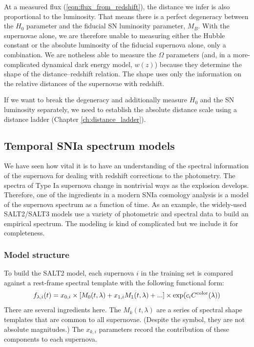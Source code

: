 At a measured flux (\ref{eqn:flux_from_redshift}), the distance we infer is also proportional to the luminosity.  That means there is a perfect degeneracy between the $H_0$ parameter and the fiducial SN luminosity parameter, $M_B$.   With the supernovae alone, we are therefore unable to measuring either the Hubble constant or the absolute luminosity of the fiducial supernova alone, only a combination.  We are notheless able to measure the $\Omega$ parameters (and, in a more-complicated dynamical dark energy model, $w(z)$) because they determine the shape of the distance--redshift relation.  The shape uses only the information on the relative distances of the supernovae with redshift.
 
If we want to break the degeneracy and additionally measure $H_0$ and the SN luminosity separately, we need to establish the absolute distance scale using a distance ladder (Chapter \ref{ch:distance_ladder}).

\subsection{Temporal SNIa spectrum models}
We have seen how vital it is to have an understanding of the spectral information of the supernova for dealing with redshift corrections to the photometry.  The spectra of Type Ia supernova change in nontrivial ways as the explosion develops.  Therefore, one of the ingredients in a modern SNIa cosmology analysis is a model of the supernova spectrum as a function of time.  As an example, the widely-used SALT2/SALT3 models \citep[Spectral Adaptive Lightcurve Template,][]{2007A&A...466...11G,2021ApJ...923..265K,2023ApJ...951...22J} use a variety of photometric and spectral data to build an empirical spectrum.  
The modeling is kind of complicated but we include it for completeness.

\subsubsection{Model structure}
To build the SALT2 model, each supernova $i$ in the training set is compared against a rest-frame spectral template with the following functional form:
\begin{equation}
  f_{\lambda,i}(t) = x_{0,i} \times [ M_0(t,\lambda) + x_{1,i} M_1(t,\lambda) + ... ] \times \exp( c_i C^{\rm color}(\lambda))
\end{equation}
There are several ingredients here.  The $M_k(t,\lambda)$ are a series of spectral shape templates that are common to all supernovae. (Despite the symbol, they are not absolute magnitudes.)  The $x_{k,i}$ parameters record the contribution of these components to each supernova.


